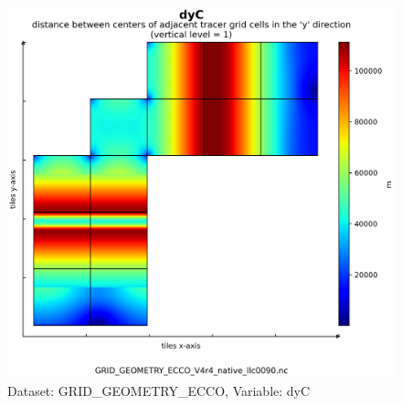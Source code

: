 \begin{figure}[H]
\centering
\includegraphics[scale=0.55]{../images/plots/native_plots_coords/Geometry_Parameters_for_the_Lat-Lon-Cap_90_(llc90)_Native_Model_Grid_(Version_4_Release_4)/dyC.png}
\caption{Dataset: GRID\_GEOMETRY\_ECCO, Variable: dyC}
\label{tab:table-GRID_GEOMETRY_ECCO_dyC-Plot}
\end{figure}
\newpage
\pagebreak
